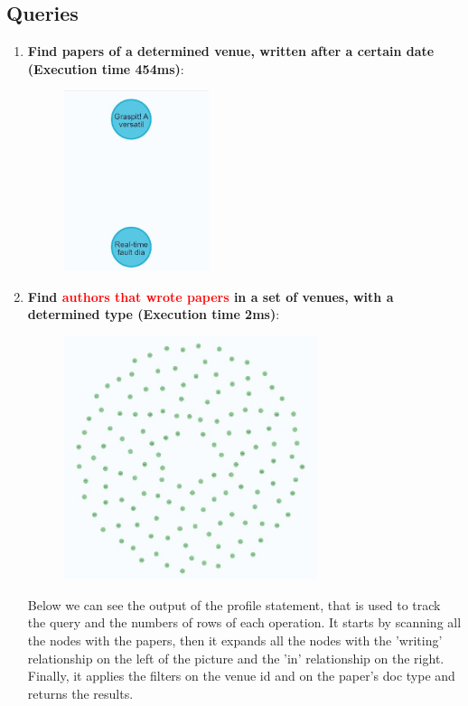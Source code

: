 \documentclass{Configuration_Files/PoliMi3i_thesis}
\begin{document}
\subsection{Queries}
\begin{enumerate}
    \item \textbf{Find papers of a determined venue, written after a certain date (Execution time 454ms)}:
    
     \begin{figure}[H]
    \centering
    \includegraphics[width=0.4\textwidth]{Images/queries_neo4j/query_1.jpg}\end{figure}
    \item \textbf{Find \textcolor{red}{authors that wrote papers} in a set of venues, with a determined type (Execution time 2ms)}:
    
     \begin{figure}[H]
    \centering
    \includegraphics[width=0.7\textwidth]{Images/queries_neo4j/query_2.jpg}
    \end{figure}
  Below we can see the output of the profile statement, that is used to track the query and the numbers of rows of each operation. It starts by scanning all the nodes with the papers, then it expands all the nodes with the 'writing' relationship on the left of the picture and the 'in' relationship on the right. Finally, it applies the filters on the venue id and on the paper's doc type and returns the results.

\end{enumerate}
\end{document}
